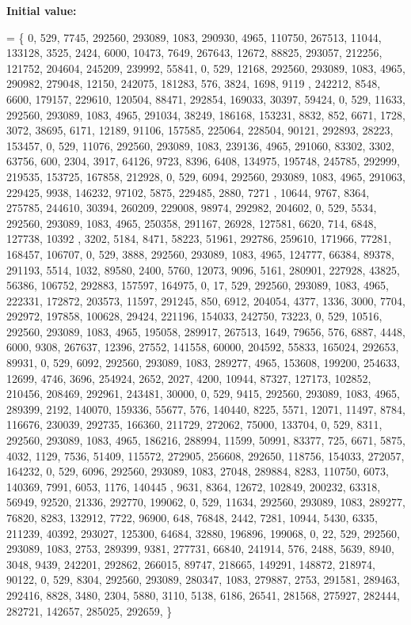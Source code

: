 {\bfseries Initial value\+:}
\begin{DoxyCode}
= \{ 
    0, 529, 7745, 292560, 293089, 1083, 290930, 4965, 110750, 267513, 11044, 133128, 3525, 2424, 6000, 
      10473, 7649, 267643, 12672, 88825, 293057, 212256, 121752, 204604, 245209, 239992, 55841, 
    0, 529, 12168, 292560, 293089, 1083, 4965, 290982, 279048, 12150, 242075, 181283, 576, 3824, 1698, 9119
      , 242212, 8548, 6600, 179157, 229610, 120504, 88471, 292854, 169033, 30397, 59424, 
    0, 529, 11633, 292560, 293089, 1083, 4965, 291034, 38249, 186168, 153231, 8832, 852, 6671, 1728, 3072, 
      38695, 6171, 12189, 91106, 157585, 225064, 228504, 90121, 292893, 28223, 153457, 
    0, 529, 11076, 292560, 293089, 1083, 239136, 4965, 291060, 83302, 3302, 63756, 600, 2304, 3917, 64126, 
      9723, 8396, 6408, 134975, 195748, 245785, 292999, 219535, 153725, 167858, 212928, 
    0, 529, 6094, 292560, 293089, 1083, 4965, 291063, 229425, 9938, 146232, 97102, 5875, 229485, 2880, 7271
      , 10644, 9767, 8364, 275785, 244610, 30394, 260209, 229008, 98974, 292982, 204602, 
    0, 529, 5534, 292560, 293089, 1083, 4965, 250358, 291167, 26928, 127581, 6620, 714, 6848, 127738, 10392
      , 3202, 5184, 8471, 58223, 51961, 292786, 259610, 171966, 77281, 168457, 106707, 
    0, 529, 3888, 292560, 293089, 1083, 4965, 124777, 66384, 89378, 291193, 5514, 1032, 89580, 2400, 5760, 
      12073, 9096, 5161, 280901, 227928, 43825, 56386, 106752, 292883, 157597, 164975, 
    0, 17, 529, 292560, 293089, 1083, 4965, 222331, 172872, 203573, 11597, 291245, 850, 6912, 204054, 4377,
       1336, 3000, 7704, 292972, 197858, 100628, 29424, 221196, 154033, 242750, 73223, 
    0, 529, 10516, 292560, 293089, 1083, 4965, 195058, 289917, 267513, 1649, 79656, 576, 6887, 4448, 6000, 
      9308, 267637, 12396, 27552, 141558, 60000, 204592, 55833, 165024, 292653, 89931, 
    0, 529, 6092, 292560, 293089, 1083, 289277, 4965, 153608, 199200, 254633, 12699, 4746, 3696, 254924, 
      2652, 2027, 4200, 10944, 87327, 127173, 102852, 210456, 208469, 292961, 243481, 30000, 
    0, 529, 9415, 292560, 293089, 1083, 4965, 289399, 2192, 140070, 159336, 55677, 576, 140440, 8225, 5571,
       12071, 11497, 8784, 116676, 230039, 292735, 166360, 211729, 272062, 75000, 133704, 
    0, 529, 8311, 292560, 293089, 1083, 4965, 186216, 288994, 11599, 50991, 83377, 725, 6671, 5875, 4032, 
      1129, 7536, 51409, 115572, 272905, 256608, 292650, 118756, 154033, 272057, 164232, 
    0, 529, 6096, 292560, 293089, 1083, 27048, 289884, 8283, 110750, 6073, 140369, 7991, 6053, 1176, 140445
      , 9631, 8364, 12672, 102849, 200232, 63318, 56949, 92520, 21336, 292770, 199062, 
    0, 529, 11634, 292560, 293089, 1083, 289277, 76820, 8283, 132912, 7722, 96900, 648, 76848, 2442, 7281, 
      10944, 5430, 6335, 211239, 40392, 293027, 125300, 64684, 32880, 196896, 199068, 
    0, 22, 529, 292560, 293089, 1083, 2753, 289399, 9381, 277731, 66840, 241914, 576, 2488, 5639, 8940, 
      3048, 9439, 242201, 292862, 266015, 89747, 218665, 149291, 148872, 218974, 90122, 
    0, 529, 8304, 292560, 293089, 280347, 1083, 279887, 2753, 291581, 289463, 292416, 8828, 3480, 2304, 
      5880, 3110, 5138, 6186, 26541, 281568, 275927, 282444, 282721, 142657, 285025, 292659, 
\}
\end{DoxyCode}
